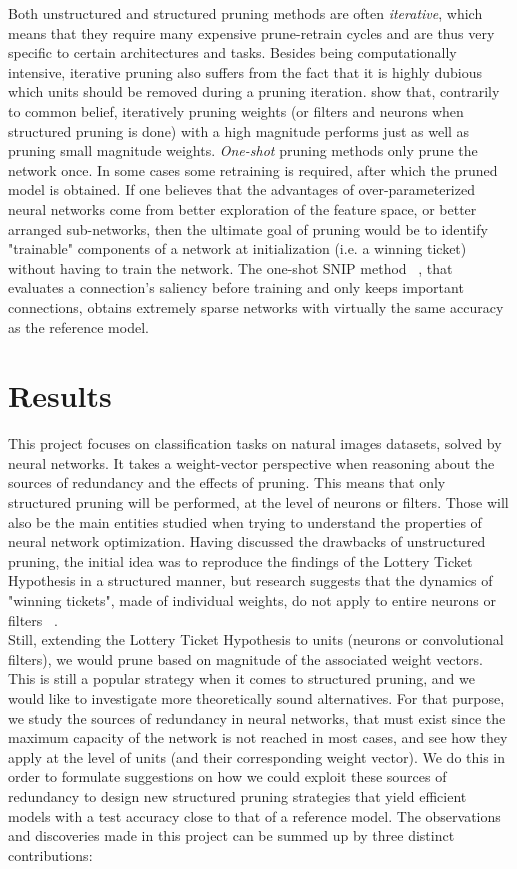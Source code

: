 Both unstructured and structured pruning methods are often \textit{iterative}, which means that they require many expensive prune-retrain cycles and are thus very specific to certain architectures and tasks. Besides being computationally intensive, iterative pruning also suffers from the fact that it is highly dubious which units should be removed during a pruning iteration. \cite{bartoldson2019generalization} show that, contrarily to common belief, iteratively pruning weights (or filters and neurons when structured pruning is done) with a high magnitude performs just as well as pruning small magnitude weights. \textit{One-shot} pruning methods only prune the network once. In some cases some retraining is required, after which the pruned model is obtained. If one believes that the advantages of over-parameterized neural networks come from better exploration of the feature space, or better arranged sub-networks, then the ultimate goal of pruning would be to identify "trainable" components of a network at initialization (i.e. a winning ticket) without having to train the network. The one-shot SNIP method ~\autocite{namhoon2018SNIP}, that evaluates a connection's saliency before training and only keeps important connections, obtains extremely sparse networks with virtually the same accuracy as the reference model. \\ 

\section{Results}

This project focuses on classification tasks on natural images datasets, solved by neural networks. It takes a weight-vector perspective when reasoning about the sources of redundancy and the effects of pruning. This means that only structured pruning will be performed, at the level of neurons or filters. Those will also be the main entities studied when trying to understand the properties of neural network optimization. Having discussed the drawbacks of unstructured pruning, the initial idea was to reproduce the findings of the Lottery Ticket Hypothesis in a structured manner, but research suggests that the dynamics of "winning tickets", made of individual weights, do not apply to entire neurons or filters ~\autocite{liu2018rethinking}. \\

Still, extending the Lottery Ticket Hypothesis to units (neurons or convolutional filters), we would prune based on magnitude of the associated weight vectors. This is still a popular strategy when it comes to structured pruning, and we would like to investigate more theoretically sound alternatives. For that purpose, we study the sources of redundancy in neural networks, that must exist since the maximum capacity of the network is not reached in most cases, and see how they apply at the level of units (and their corresponding weight vector). We do this in order to formulate suggestions on how we could exploit these sources of redundancy to design new structured pruning strategies that yield efficient models with a test accuracy close to that of a reference model. The observations and discoveries made in this project can be summed up by three distinct contributions:

